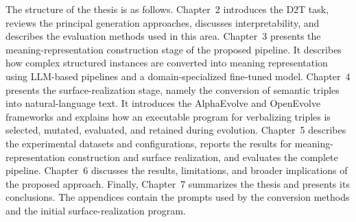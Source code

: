 The structure of the thesis is as follows. Chapter~2 introduces the D2T task,
reviews the principal generation approaches, discusses interpretability, and
describes the evaluation methods used in this area. Chapter~3 presents the
meaning-representation construction stage of the proposed pipeline. It describes
how complex structured instances are converted into meaning representation using
LLM-based pipelines and a domain-specialized fine-tuned model.
Chapter~4 presents the surface-realization stage, namely the conversion of
semantic triples into natural-language text. It introduces the AlphaEvolve and
OpenEvolve frameworks and explains how an executable program for verbalizing
triples is selected, mutated, evaluated, and retained during evolution.
Chapter~5 describes the experimental datasets and configurations, reports the
results for meaning-representation construction and surface realization, and
evaluates the complete pipeline. Chapter~6 discusses the results, limitations,
and broader implications of the proposed approach. Finally, Chapter~7
summarizes the thesis and presents its conclusions. The appendices contain the
prompts used by the conversion methods and the initial surface-realization
program.
